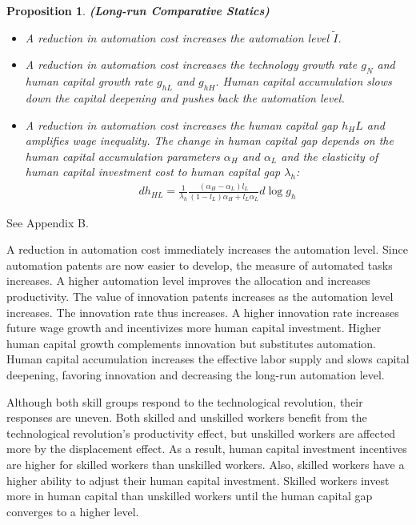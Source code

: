 \documentclass[12pt]{article}
\newtheorem{proposition}{Proposition}
\begin{document}
\begin{proposition}{\bf (Long-run Comparative Statics)} 
\begin{itemize}
\item A reduction in automation cost increases the automation level $\tilde{I}$.
\item A reduction in automation cost increases the technology growth rate $g_N$ and human capital growth rate $g_{hL}$ and $g_{hH}$. Human capital accumulation slows down the capital deepening and pushes back the automation level. 
\item  A reduction in automation cost increases the human capital gap $h_HL$ and amplifies wage inequality. The change in human capital gap depends on the human capital accumulation parameters $\alpha_H$ and $\alpha_L$ and the elasticity of human capital investment cost to human capital gap $\lambda_h$:
\begin{align*}
dh_{HL} = \frac{1}{\lambda_h}\frac{(\alpha_H-\alpha_L)l_L}{(1-l_L)\alpha_H+l_L\alpha_L}d\log g_h
\end{align*}
\end{itemize}
\end{proposition}
 See Appendix B.

A reduction in automation cost immediately increases the automation level. Since automation patents are now easier to develop, the measure of automated tasks increases. A higher automation level improves the allocation and increases productivity. The value of innovation patents increases as the automation level increases. The innovation rate thus increases. A higher innovation rate increases future wage growth and incentivizes more human capital investment. Higher human capital growth complements innovation but substitutes automation. Human capital accumulation increases the effective labor supply and slows capital deepening, favoring innovation and decreasing the long-run automation level. 

Although both skill groups respond to the technological revolution, their responses are uneven. Both skilled and unskilled workers benefit from the technological revolution's productivity effect, but unskilled workers are affected more by the displacement effect. As a result, human capital investment incentives are higher for skilled workers than unskilled workers. Also, skilled workers have a higher ability to adjust their human capital investment. Skilled workers invest more in human capital than unskilled workers until the human capital gap converges to a higher level. 
\end{document}
